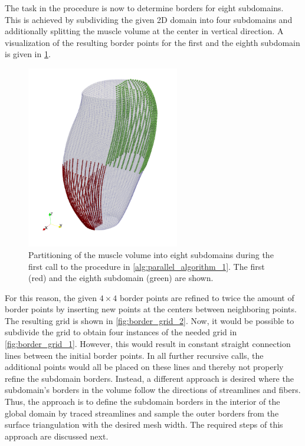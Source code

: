 The task in the procedure is now to determine borders for eight subdomains. This is achieved by subdividing the given 2D domain into four subdomains and additionally splitting the muscle volume at the center in vertical direction.
A visualization of the resulting border points for the first and the eighth subdomain is given in \cref{fig:subdomain}.

\begin{figure}%
  \centering%
  \includegraphics[height=8cm]{images/parallel_fiber_estimation/subdomains_2.png}%
  \caption{Partitioning of the muscle volume into eight subdomains during the first call to the procedure in \cref{alg:parallel_algorithm_1}. The first (red) and the eighth subdomain (green) are shown.}%
  \label{fig:subdomain}%
\end{figure}%

For this reason, the given $4 \times 4$ border points are refined to twice the amount of border points by inserting new points at the centers between neighboring points. The resulting grid is shown in \cref{fig:border_grid_2}. Now, it would be possible to subdivide the grid to obtain four instances of the needed grid in \cref{fig:border_grid_1}.
However, this would result in constant straight connection lines between the initial border points. In all further recursive calls, the additional points would all be placed on these lines and thereby not properly refine the subdomain borders. Instead, a different approach is desired where the subdomain's borders in the volume follow the directions of streamlines and fibers. Thus, the approach is to define the subdomain borders in the interior of the global domain by traced streamlines and sample the outer borders from the surface triangulation with the desired mesh width. The required steps of this approach are discussed next.

